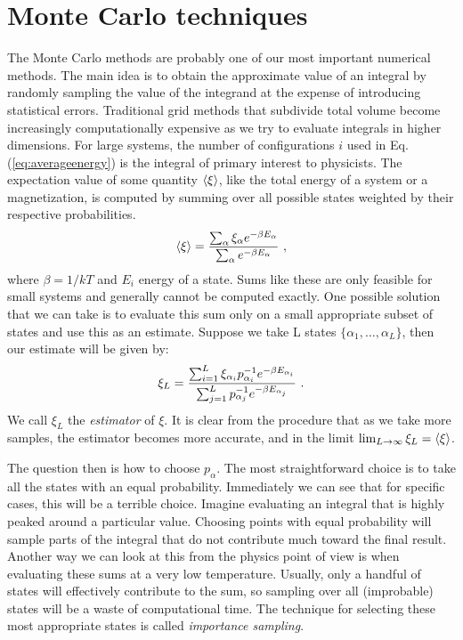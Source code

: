 \section{Monte Carlo techniques}
The Monte Carlo methods are probably one of our most important numerical methods. The main idea is to obtain the approximate value of an integral by randomly sampling the value of the integrand at the expense of introducing statistical errors. Traditional grid methods that subdivide total volume become increasingly computationally expensive as we try to evaluate integrals in higher dimensions. For large systems, the number of configurations $i$ used in Eq.(\ref{eq:averageenergy}) is the integral of primary interest to physicists. The expectation value of some quantity $\expval{\xi}$, like the total energy of a system or a magnetization, is computed by summing over all possible states weighted by their respective probabilities.
\begin{equation}
	\expval{\xi} = \frac{\sum_\alpha \xi_\alpha e^{-\beta E_\alpha}}{\sum_\alpha e^{-\beta E_\alpha}} \ ,
\end{equation}
where $\beta = 1/kT$ and $E_i$ energy of a state. Sums like these are only feasible for small systems and generally cannot be computed exactly. One possible solution that we can take is to evaluate this sum only on a small appropriate subset of states and use this as an estimate. Suppose we take L states $\{ \alpha_1, \dots, \alpha_L\}$, then our estimate will be given by:
\begin{equation}
	\xi_L = \frac{\sum_{i=1}^{L}\xi_{\alpha_i}p_{\alpha_i}^{-1}e^{-\beta E_{\alpha_i}}}{\sum_{j=1}^L p_{\alpha_j}^{-1}e^{-\beta E_{\alpha_j}}} \ .	
	\label{eq:estimator}
\end{equation}
We call $\xi_L$ the \textit{estimator} of $\xi$. It is clear from the procedure that as we take more samples, the estimator becomes more accurate, and in the limit $\lim_{L \rightarrow \infty} \xi_L = \expval{\xi}$. 
\par
The question then is how to choose $p_\alpha$. The most straightforward choice is to take all the states with an equal probability. Immediately we can see that for specific cases, this will be a terrible choice. Imagine evaluating an integral that is highly peaked around a particular value. Choosing points with equal probability will sample parts of the integral that do not contribute much toward the final result. Another way we can look at this from the physics point of view is when evaluating these sums at a very low temperature. Usually, only a handful of states will effectively contribute to the sum, so sampling over all (improbable) states will be a waste of computational time. The technique for selecting these most appropriate states is called \textit{importance sampling}. 
